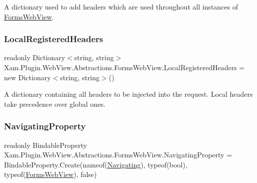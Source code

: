 A dictionary used to add headers which are used throughout all instances of \hyperlink{class_xam_1_1_plugin_1_1_web_view_1_1_abstractions_1_1_forms_web_view}{Forms\+Web\+View}. 

\mbox{\label{class_xam_1_1_plugin_1_1_web_view_1_1_abstractions_1_1_forms_web_view_ab54daf04e5112c23ca17c779fff81c36}} 
\subsubsection{\texorpdfstring{Local\+Registered\+Headers}{LocalRegisteredHeaders}}
{\footnotesize\ttfamily readonly Dictionary$<$string, string$>$ Xam.\+Plugin.\+Web\+View.\+Abstractions.\+Forms\+Web\+View.\+Local\+Registered\+Headers = new Dictionary$<$string, string$>$()}



A dictionary containing all headers to be injected into the request. Local headers take precedence over global ones. 

\mbox{\label{class_xam_1_1_plugin_1_1_web_view_1_1_abstractions_1_1_forms_web_view_a77bf69030f0aac583e6fe7f61603fcd6}} 
\subsubsection{\texorpdfstring{Navigating\+Property}{NavigatingProperty}}
{\footnotesize\ttfamily readonly Bindable\+Property Xam.\+Plugin.\+Web\+View.\+Abstractions.\+Forms\+Web\+View.\+Navigating\+Property = Bindable\+Property.\+Create(nameof(\hyperlink{class_xam_1_1_plugin_1_1_web_view_1_1_abstractions_1_1_forms_web_view_a63f9c0f6a44497e9febc0b4922cbe838}{Navigating}), typeof(bool), typeof(\hyperlink{class_xam_1_1_plugin_1_1_web_view_1_1_abstractions_1_1_forms_web_view}{Forms\+Web\+View}), false)\hspace{0.3cm}{\ttfamily [static]}}



